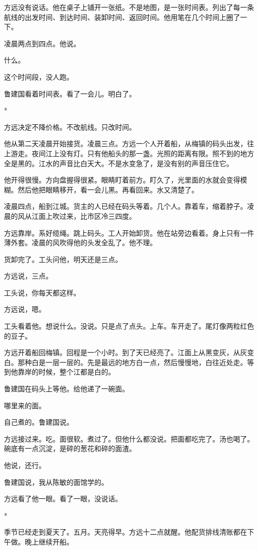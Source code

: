 \documentclass[UTF8,a5paper,11pt,openany]{ctexbook}
\newcommand{\scene}{\vspace{1em}\begin{center}*\quad*\quad*\end{center}\vspace{0.5em}}
\begin{document}
方远没有说话。他在桌子上铺开一张纸。不是地图，是一张时间表。列出了每一条航线的出发时间、到达时间、装卸时间、返回时间。他用笔在几个时间上圈了一下。

凌晨两点到四点。他说。

什么。

这个时间段，没人跑。

鲁建国看着时间表。看了一会儿。明白了。


\scene

方远决定不降价格。不改航线。只改时间。

他从第二天凌晨开始接货。凌晨三点。方远一个人开着船，从梅镇的码头出发，往上游走。夜间江上没有灯。只有他船头的那一盏。光照的距离有限。照不到的地方全是黑的。江水的声音比白天大。不是水变急了，是没有别的声音压住它。

他开得很慢。方向盘握得很紧。眼睛盯着前方。盯久了，光里面的水就会变得模糊。然后他把眼睛移开，看一会儿黑。再看回来。水又清楚了。

凌晨四点，船到江城。货主的人已经在码头等着。几个人。靠着车，缩着脖子。凌晨的风从江面上吹过来，比市区冷三四度。

方远靠岸。系好缆绳。跳上码头。工人开始卸货。他在站旁边看着。身上只有一件薄外套。凌晨的风吹得他的头发全乱了。他不理。

货卸完了。工头问他，明天还是三点。

方远说，三点。

工头说，你每天都这样。

方远说，嗯。

工头看着他。想说什么。没说。只是点了点头。上车。车开走了。尾灯像两粒红色的豆子。

方远开着船回梅镇。回程是一个小时。到了天已经亮了。江面上从黑变灰，从灰变白。那种白是一层一层的。先是最远的地方白一点，然后慢慢地，白往近处走。等到他靠岸的时候，整个江都是白的。

鲁建国在码头上等他。给他递了一碗面。

哪里来的面。

自己煮的。鲁建国说。

方远接过来。吃。面很软。煮过了。但他什么都没说。把面都吃完了。汤也喝了。碗底有一点沉淀，是碎的葱花和碎的面渣。

他说，还行。

鲁建国说，我从陈敏的面馆学的。

方远看了他一眼。看了一眼，没说话。


\scene

季节已经走到夏天了。五月。天亮得早。方远十二点就醒。他配货排线清账都在下午做。晚上继续开船。
\end{document}
